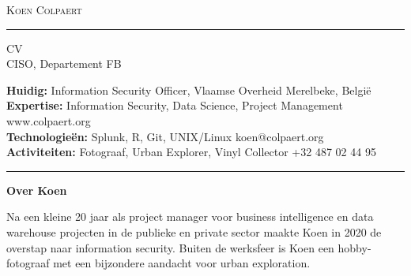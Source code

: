 \documentclass[10pt,A4]{article}
\newcommand{\cvsection}[1]
{
	\begin{center}
		\large\textcolor{sectcol}{\textbf{#1}}
	\end{center}
}
\newcommand{\metasection}[2]
{
\footnotesize{#2} \hspace*{\fill} \footnotesize{#1}\\[1pt]
}
\begin{document}
\pagestyle{fancy}	








\vspace{-8pt}
\begin{center}
	\HUGE \textsc{Koen Colpaert} \textcolor{sectcol}{\rule[-1mm]{1mm}{0.9cm}} \textsc{CV}\\[2pt]
	\small CISO, Departement FB
\end{center}



\vspace{6pt}


\metasection{Merelbeke, België}{\textbf{Huidig:} Information Security Officer, Vlaamse Overheid}
\metasection{www.colpaert.org}{\textbf{Expertise:} Information Security, Data Science, Project Management} 
\metasection{koen@colpaert.org}{\textbf{Technologieën:} Splunk, R, Git, UNIX/Linux}
\metasection{+32 487 02 44 95}{\textbf{Activiteiten:} Fotograaf, Urban Explorer, Vinyl Collector}
\vspace{-2pt}
\textcolor{softcol}{\hrule}
\vspace{6pt}

\normalsize

\vspace{-6pt}
\cvsection{Over Koen}
Na een kleine 20 jaar als project manager voor business intelligence en data warehouse projecten in de publieke en private sector maakte Koen in 2020 de overstap naar information security. Buiten de werksfeer is Koen een hobby-fotograaf met een bijzondere aandacht voor urban exploration.\\
\end{document}
